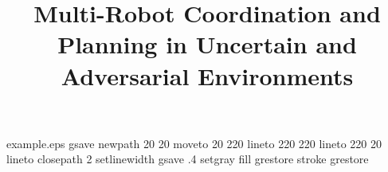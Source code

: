 %
%
%
%
%
\begin{filecontents*}{example.eps}
gsave
newpath
  20 20 moveto
  20 220 lineto
  220 220 lineto
  220 20 lineto
closepath
2 setlinewidth
gsave
  .4 setgray fill
grestore
stroke
grestore
\end{filecontents*}
%
\RequirePackage{fix-cm}
%
\documentclass[twocolumn]{svjour3}          %
%
\smartqed  %
%
\let\proof\relax 
\let\endproof\relax
\usepackage{graphicx,amsmath,amsfonts,amssymb,amsthm,epsfig,epstopdf,url,array,xcolor,soul,subfigure,filecontents}
\usepackage{textcomp}
\usepackage[misc]{ifsym}
\usepackage[numbers]{natbib}
\usepackage{tabularx, booktabs, makecell, caption}
\usepackage{siunitx}
%
%
%
%
%
\newcommand{\rev}[1]{{\color{black}{#1}}}


\title{Multi-Robot Coordination and Planning in Uncertain and Adversarial Environments%
}

